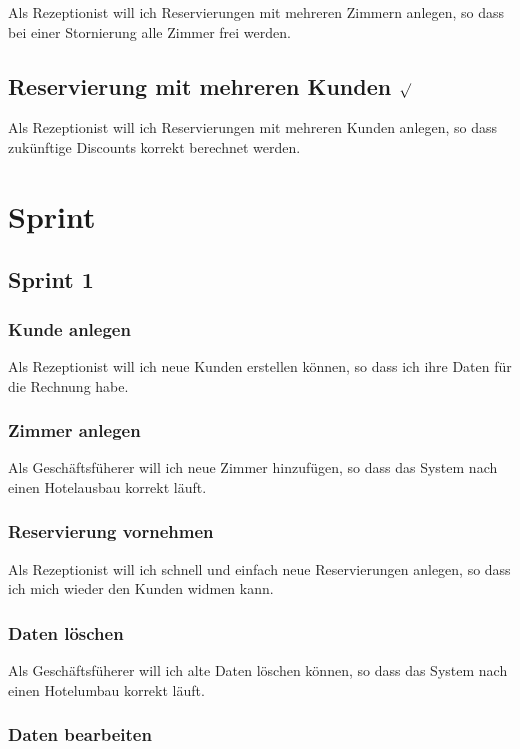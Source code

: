 \documentclass[11pt]{scrartcl}
\begin{document}
Als Rezeptionist will ich Reservierungen mit mehreren Zimmern anlegen, so dass bei einer Stornierung alle Zimmer frei werden.

\subsection{Reservierung mit mehreren Kunden $\surd$}

Als Rezeptionist will ich Reservierungen mit mehreren Kunden anlegen, so dass zukünftige Discounts korrekt berechnet werden.

\section{Sprint}

\subsection{Sprint 1}

\subsubsection{Kunde anlegen}

Als Rezeptionist will ich neue Kunden erstellen können, so dass ich ihre Daten für die Rechnung habe.

\subsubsection{Zimmer anlegen}

Als Geschäftsfüherer will ich neue Zimmer hinzufügen, so dass das System nach einen Hotelausbau korrekt läuft.

\subsubsection{Reservierung vornehmen}

Als Rezeptionist will ich schnell und einfach neue Reservierungen anlegen, so dass ich mich wieder den Kunden widmen kann.

\subsubsection{Daten löschen}

Als Geschäftsfüherer will ich alte Daten löschen können, so dass das System nach einen Hotelumbau korrekt läuft.

\subsubsection{Daten bearbeiten}
\end{document}
